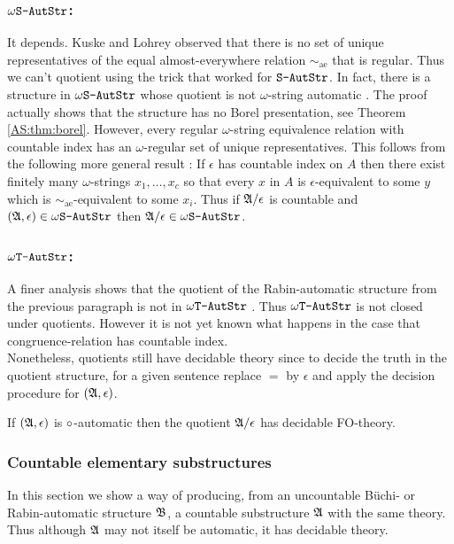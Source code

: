 \subsubsection*{$\mbox{\tt $\omega$S-AutStr}$:} It depends.
Kuske and Lohrey \cite{KuLo08JSL} observed that there is no set of unique representatives of the equal almost-everywhere relation $\sim_{\textrm{ae}}$ that is regular.
Thus we can't quotient using the trick that worked for $\mbox{\tt S-AutStr}$. In fact, there is a structure in $\mbox{\tt $\omega$S-AutStr}$ whose quotient is not $\omega$-string 
automatic \cite{HKMN08}. The proof actually shows that the structure has no Borel presentation, see Theorem \ref{AS:thm:borel}.
However, every regular $\omega$-string equivalence relation with countable index has an $\omega$-regular set of unique representatives.
This follows from the following more general result  \cite{BKRu08}:
If $\epsilon$ has countable index on $A$ then there exist finitely many $\omega$-strings $x_1,\dots,x_c$ 
so that every $x$  in $A$ is $\epsilon$-equivalent to some $y$ which is $\sim_{\textrm{ae}}$-equivalent to some  $x_i$.  Thus if $\mathfrak{A} /\epsilon$ is 
countable and $(\mathfrak{A},\epsilon) \in \mbox{\tt $\omega$S-AutStr}$ then $\mathfrak{A}/\epsilon \in \mbox{\tt $\omega$S-AutStr}$.

\subsubsection*{$\mbox{\tt $\omega$T-AutStr}$:} A finer analysis shows that the quotient of the Rabin-automatic structure from the previous paragraph is not in $\mbox{\tt $\omega$T-AutStr}$ \cite{HKMN08}.
Thus $\mbox{\tt $\omega$T-AutStr}$ is not closed under quotients. However it is not yet known what happens in the case that congruence-relation has countable index.
~\\

Nonetheless, quotients still have decidable theory since to decide the truth in the quotient structure, for a given sentence replace $=$ by $\epsilon$ and apply the decision procedure for $(\mathfrak{A},\epsilon)$.

\begin{proposition} \cite{CoLo07}
If $(\mathfrak{A},\epsilon)$ is $\circ$-automatic then the quotient $\mathfrak{A}/\epsilon$ has decidable FO-theory.
\end{proposition}

\subsubsection*{Countable elementary substructures}

In this section we show a way of producing, from an uncountable B\"uchi- or Rabin-automatic structure $\mathfrak{B}$, a countable substructure $\mathfrak{A}$
with the same theory. Thus although $\mathfrak{A}$ may not itself be automatic, it has decidable theory.


